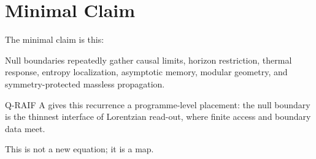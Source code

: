 \documentclass[12pt,a4paper]{article}
\theoremstyle{definition}
\theoremstyle{remark}
\begin{document}
\section{Minimal Claim}\label{minimal-claim}

The minimal claim is this:

Null boundaries repeatedly gather causal limits, horizon restriction,
thermal response, entropy localization, asymptotic memory, modular
geometry, and symmetry-protected massless propagation.

Q-RAIF A gives this recurrence a programme-level placement: the null
boundary is the thinnest interface of Lorentzian read-out, where finite
access and boundary data meet.

This is not a new equation; it is a map.

\end{document}
